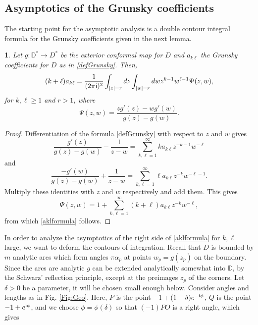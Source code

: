 \documentclass{article}
\numberwithin{equation}{section}
\numberwithin{figure}{section}
\theoremstyle{plain}
\theoremstyle{plain}
\newtheorem{lemma}[thm]{\protect\lemmaname}
\numberwithin{thm}{section}
\theoremstyle{remark}
\providecommand{\lemmaname}{Lemma}
\newcommand{\D}{\mathbb{D}}
\newcommand{\I}{{\rm i}}
\let \ge \geqslant
\begin{document}
\subsection{Asymptotics of the Grunsky coefficients}\label{Subsec:Asym}
The starting point for the asymptotic analysis is a double contour integral formula for the Grunsky coefficients given in the next lemma.
\begin{lemma}\label{Lem:Intfor} 
Let $g:\D^* \to  D^*$ be the exterior conformal map for $D$ and $a_{k\ell}$ the Grunsky coefficients for $D$ as in \eqref{defGrunsky}. Then,
\begin{equation}\label{aklformula}
(k+\ell)a_{k\ell}=\frac 1{(2\pi\I)^2}\int_{|z|=r}dz\int_{|w|=r}dw z^{k-1}w^{\ell-1}\Psi(z,w),
\end{equation}
for $k,\ell\ge 1$ and $r>1$, where
\begin{equation}\label{Psi}
\Psi(z,w)=\frac{zg'(z)-wg'(w)}{g(z)-g(w)}.
\end{equation}
\end{lemma}

\begin{proof}
Differentiation of the formula \eqref{defGrunsky} with respect to $z$ and $w$ gives
\begin{equation*}
\frac{g'(z)}{g(z)-g(w)}-\frac 1{z-w}=\sum_{k,\ell=1}^\infty ka_{k\ell}z^{-k-1}w^{-\ell}
\end{equation*}
and
\begin{equation*}
\frac{-g'(w)}{g(z)-g(w)}+\frac 1{z-w}=\sum_{k,\ell=1}^\infty \ell a_{k\ell}z^{-k}w^{-\ell-1}.
\end{equation*}
Multiply these identities with $z$ and $w$ respectively and add them. This gives
\begin{equation*}
\Psi(z,w)=1+\sum_{k,\ell=1}^\infty (k+\ell) a_{k\ell}z^{-k}w^{-\ell},
\end{equation*}
from which \eqref{aklformula} follows.
\end{proof}

In order to analyze the asymptotics of the right side of \eqref{aklformula} for $k,\ell$ large, we want to deform the contours of integration. Recall that $D$ is bounded by $m$ analytic 
arcs which form angles $\pi\alpha_p$ at points $w_p=g(z_p)$ on the boundary. Since the arcs are analytic $g$ can be extended analytically somewhat into $\D$, by the Schwarz' reflection principle, except at the
preimages $z_p$ of the corners. Let $\delta>0$ be a parameter, it will be chosen small enough  below. Consider angles and lengths as in Fig.
\ref{Fig:Geo}. Here, $P$ is the point $-1+(1-\delta)e^{-\I\phi}$, $Q$ is the point $-1+e^{\I\phi}$, and we choose $\phi=\phi(\delta)$ so that $(-1)PO$ is a right angle, which gives
\end{document}
